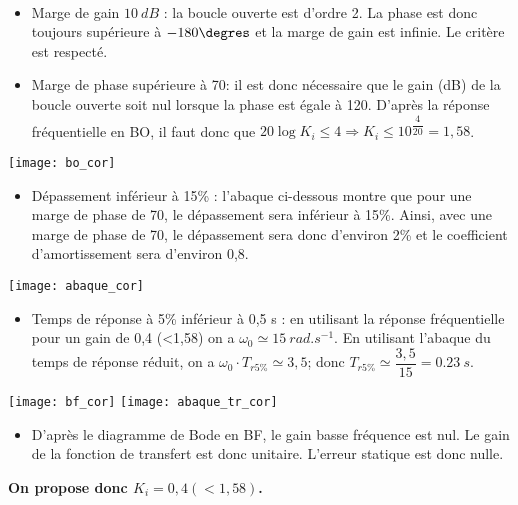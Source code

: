 \ifprof
\begin{corrige}~\\
\begin{itemize}
\item Marge de gain $\SI{10}{dB}$ :  la boucle ouverte est d'ordre 2. La phase est donc toujours supérieure à $-180\degres$ et la marge de gain est infinie. Le critère est respecté. 
\item Marge de phase supérieure à 70\degres : il est donc nécessaire que le gain (dB) de la boucle ouverte soit nul lorsque la phase est égale à 120\degres. D'après la réponse fréquentielle en BO, il faut donc que $20\log K_i \leq 4 \Rightarrow K_i \leq  10^{\dfrac{4}{20}}=1,58$.
\end{itemize}

\begin{center}
\texttt{[image: bo\_cor]}
\end{center}

\begin{itemize}
\item Dépassement inférieur à 15\% : l'abaque ci-dessous montre que pour une marge de phase de 70\degres, le dépassement sera inférieur à 15\%. Ainsi, avec une marge de phase de 70\degres, le dépassement sera donc d'environ 2\% et le coefficient d'amortissement sera d'environ 0,8. 
\end{itemize}
\begin{center}
\texttt{[image: abaque\_cor]}
\end{center}
\begin{itemize}
\item Temps de réponse à 5\% inférieur à 0,5 s : en utilisant la réponse fréquentielle pour un gain de 0,4 (<1,58) on a $\omega_0\simeq \SI {15}{rad.s^{-1}}$. En utilisant l'abaque du temps de réponse réduit, on a  $\omega_0 \cdot T_{r5\%}\simeq 3,5$; donc $T_{r5\%}\simeq \dfrac{3,5}{15} = \SI{0,23}{s}$. 

\end{itemize}

\begin{center}
\texttt{[image: bf\_cor]} \hfill
\texttt{[image: abaque\_tr\_cor]}
\end{center}

\begin{itemize}
\item D'après le diagramme de Bode en BF, le gain basse fréquence est nul. Le gain de la fonction de transfert est donc unitaire. L'erreur statique est donc nulle. 
\end{itemize}

\textbf{On propose donc $K_i=0,4 (<1,58)$.}
\end{corrige}
\else
\fi



